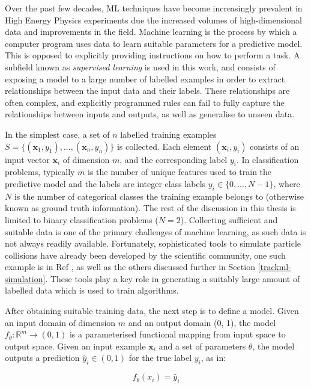 Over the past few decades, ML techniques have become increasingly prevalent in High Energy Physics experiments due the increased volumes of high-dimensional data and improvements in the field. Machine learning is the process by which a computer program uses data to learn suitable parameters for a predictive model. This is opposed to explicitly providing instructions on how to perform a task. A subfield known as \textit{supervised learning} is used in this work, and consists of exposing a model to a large number of labelled examples in order to extract relationships between the input data and their labels. These relationships are often complex, and explicitly programmed rules can fail to fully capture the relationships between inputs and outputs, as well as generalise to unseen data.

In the simplest case, a set of $n$ labelled training examples $S = \{(\textbf{x}_1, y_1), ..., (\textbf{x}_n, y_n)\}$ is collected. Each element $(\textbf{x}_i,y_i)$ consists of an input vector $\textbf{x}_i$ of dimension $m$, and the corresponding label $y_i$. In classification problems, typically $m$ is the number of unique features used to train the predictive model and the labels are integer class labels $y_i \in \{0,...,N − 1\}$, where $N$ is the number of categorical classes the training example belongs to (otherwise known as ground truth information). The rest of the discussion in this thesis is limited to binary classification problems ($N = 2$). Collecting sufficient and suitable data is one of the primary challenges of machine learning, as such data is not always readily available. Fortunately, sophisticated tools to simulate particle collisions have already been developed by the scientific community, one such example is in Ref \cite{Boos:2001cv}, as well as the others discussed further in Section \ref{trackml-simulation}. These tools play a key role in generating a suitably large amount of labelled data which is used to train algorithms.

After obtaining suitable training data, the next step is to define a model. Given an input domain of dimension $m$ and an output domain (0, 1), the model $f_{\theta} : \mathbb{R}^{m} \to (0, 1)$ is a parameterised functional mapping from input space to output space. Given an input example $\textbf{x}_i$ and a set of parameters $\theta$, the model outputs a prediction $\hat{y}_i \in (0, 1)$ for the true label $y_i$, as in:


\begin{equation}
    f_{\theta}(x_i) = \hat{y}_i
\end{equation}

